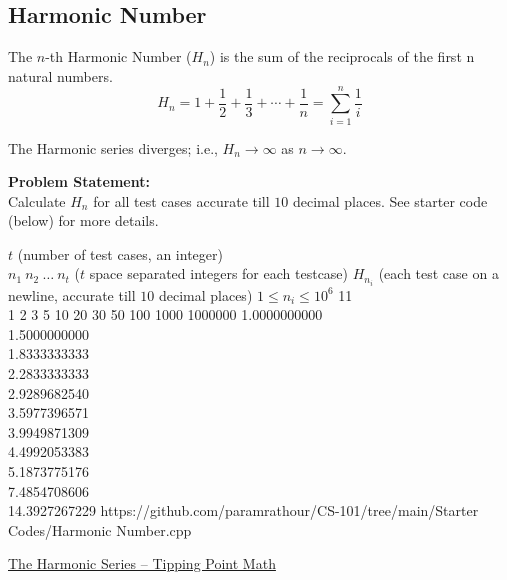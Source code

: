 \documentclass[../../Problems]{subfiles}
\begin{document}
\subsection{Harmonic Number}{\label{pp:harmonic}}
The $n$-th Harmonic Number ($H_n$) is the sum of the reciprocals of the first n natural numbers.
\begin{equation}
{H_{n}=1+{\frac {1}{2}}+{\frac {1}{3}}+\cdots +{\frac {1}{n}}=\sum _{i=1}^{n}{\frac {1}{i}}}
\end{equation}
\begin{fact}
The Harmonic series diverges; i.e., $H_n \rightarrow\infty$ as $n\rightarrow\infty$.
\end{fact}
\textbf{Problem Statement:}\\
Calculate $H_n$ for all test cases accurate till $10$ decimal places. See starter code (below) for more details.
\begin{testcases}
	{$t$ \hfill(number of test cases, an integer)\\
	$n_1\ n_2\ \ldots\ n_t$ \hfill($t$ space separated integers for each testcase)}
	{$H_{n_i}$ \hfill(each test case on a newline, accurate till $10$ decimal places)}
	{$1 \leq n_i \leq 10^{6}$}
	{11\\1 2 3 5 10 20 30 50 100 1000 1000000}
	{1.0000000000\\1.5000000000\\1.8333333333\\2.2833333333\\2.9289682540\\3.5977396571\\3.9949871309\\4.4992053383\\5.1873775176\\7.4854708606\\14.3927267229}
	{https://github.com/paramrathour/CS-101/tree/main/Starter Codes/Harmonic Number.cpp}
\end{testcases}
\begin{funvideo}
\href{https://youtu.be/Dgcoa2yAUfw}{The Harmonic Series -- Tipping Point Math}
\end{funvideo}
\end{document}

